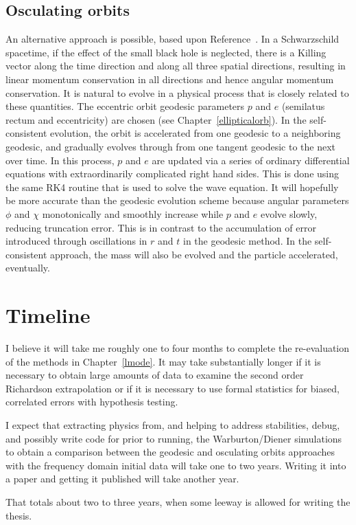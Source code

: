 \subsection{Osculating orbits}

An alternative approach is possible, based upon Reference~\cite{pound_poisson}. In a Schwarzschild spacetime, if the effect of the small black hole is neglected, there is a Killing vector along the time direction and along all three spatial directions, resulting in linear momentum conservation in all directions and hence angular momentum conservation. It is natural to evolve in a physical process that is closely related to these quantities. The eccentric orbit geodesic parameters $p$ and $e$ (semilatus rectum and eccentricity) are chosen (see Chapter~\ref{ellipticalorb}). In the self-consistent evolution, the orbit is accelerated from one geodesic to a neighboring geodesic, and gradually evolves through from one tangent geodesic to the next over time. In this process, $p$ and $e$ are updated via a series of ordinary differential equations with extraordinarily complicated right hand sides. This is done using the same RK4 routine that is used to solve the wave equation. It will hopefully be more accurate than the geodesic evolution scheme because angular parameters $\phi$ and $\chi$ monotonically and smoothly increase while $p$ and $e$ evolve slowly, reducing truncation error. This is in contrast to the accumulation of error introduced through oscillations in $r$ and $t$ in the geodesic method. In the self-consistent approach, the mass will also be evolved and the particle accelerated, eventually. 



\section{Timeline}

I believe it will take me roughly one to four months to complete the re-evaluation of the methods in Chapter~\ref{lmode}. It may take substantially longer if it is necessary to obtain large amounts of data to examine the second order Richardson extrapolation or if it is necessary to use formal statistics for biased, correlated errors with hypothesis testing.

I expect that extracting physics from, and helping to address stabilities, debug, and possibly write code for prior to running, the Warburton/Diener simulations to obtain a comparison between the geodesic and osculating orbits approaches with the frequency domain initial data will take one to two years. Writing it into a paper and getting it published will take another year.

That totals about two to three years, when some leeway is allowed for writing the thesis. 



